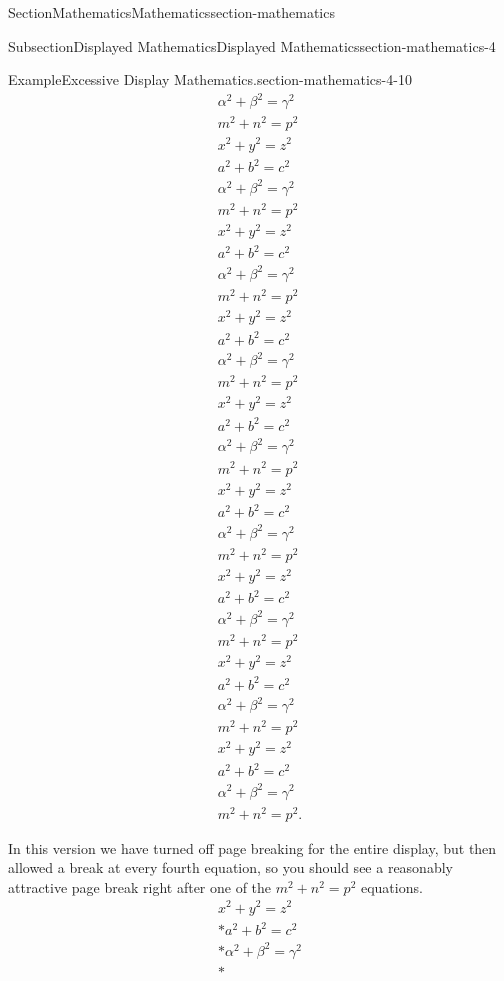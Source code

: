 \documentclass[twoside,10pt,]{article}
\numberwithin{equation}{section}
\begin{document}
\begin{sectionptx}{Section}{Mathematics}{}{Mathematics}{}{}{section-mathematics}
\begin{subsectionptx}{Subsection}{Displayed Mathematics}{}{Displayed Mathematics}{}{}{section-mathematics-4}
\begin{example}{Example}{Excessive Display Mathematics.}{section-mathematics-4-10}
\begin{gather*}
\alpha^2+\beta^2=\gamma^2\\
m^2+n^2=p^2\\
x^2+y^2=z^2\\
a^2+b^2=c^2\\
\alpha^2+\beta^2=\gamma^2\\
m^2+n^2=p^2\\
x^2+y^2=z^2\\
a^2+b^2=c^2\\
\alpha^2+\beta^2=\gamma^2\\
m^2+n^2=p^2\\
x^2+y^2=z^2\\
a^2+b^2=c^2\\
\alpha^2+\beta^2=\gamma^2\\
m^2+n^2=p^2\\
x^2+y^2=z^2\\
a^2+b^2=c^2\\
\alpha^2+\beta^2=\gamma^2\\
m^2+n^2=p^2\\
x^2+y^2=z^2\\
a^2+b^2=c^2\\
\alpha^2+\beta^2=\gamma^2\\
m^2+n^2=p^2\\
x^2+y^2=z^2\\
a^2+b^2=c^2\\
\alpha^2+\beta^2=\gamma^2\\
m^2+n^2=p^2\\
x^2+y^2=z^2\\
a^2+b^2=c^2\\
\alpha^2+\beta^2=\gamma^2\\
m^2+n^2=p^2\\
x^2+y^2=z^2\\
a^2+b^2=c^2\\
\alpha^2+\beta^2=\gamma^2\\
m^2+n^2=p^2\text{.}
\end{gather*}
%
\par
In this version we have turned off page breaking for the entire display, but then allowed a break at every fourth equation, so you should see a reasonably attractive page break right after one of the \(m^2+n^2=p^2\) equations.%
\begin{gather}
x^2+y^2=z^2\label{section-mathematics-4-10-3-2-1}\\*
a^2+b^2=c^2\label{section-mathematics-4-10-3-2-2}\\*
\alpha^2+\beta^2=\gamma^2\label{section-mathematics-4-10-3-2-3}\\*

\end{gather}
\end{example}
\end{subsectionptx}
\end{sectionptx}
\end{document}
